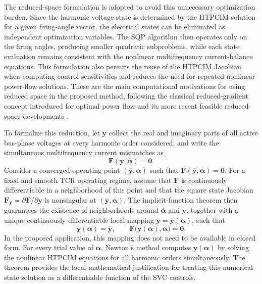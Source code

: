 \documentclass[journal]{IEEEtran}
\begin{document}
The reduced-space formulation is adopted to avoid this unnecessary
optimization burden. Since the harmonic voltage state is determined by the
HTPCIM solution for a given firing-angle vector, the electrical states can be
eliminated as independent optimization variables. The SQP algorithm then
operates only on the firing angles, producing smaller quadratic subproblems,
while each state evaluation remains consistent with the nonlinear
multifrequency current-balance equations. This formulation also permits the
reuse of the HTPCIM Jacobian when computing control sensitivities and reduces
the need for repeated nonlinear power-flow solutions. These are the main
computational motivations for using reduced space in the proposed method,
following the classical reduced-gradient concept introduced for optimal
power flow and its more recent feasible reduced-space developments
\cite{DommelTinney1968,Pacaud2022ReducedSpace}.

To formalize this reduction, let
$\bm{y}$ collect the real and imaginary parts of all active bus-phase
voltages at every harmonic order considered, and write the simultaneous
multifrequency current mismatches as
\begin{equation}
    \bm{F}(\bm{y},\bm{\alpha})=\bm{0}.
    \label{eq:htpcim_state_equations}
\end{equation}
Consider a converged operating point
$(\overline{\bm{y}},\overline{\bm{\alpha}})$ such that
$\bm{F}(\overline{\bm{y}},\overline{\bm{\alpha}})=\bm{0}$. For a fixed and
smooth TCR operating regime, assume that $\bm{F}$ is continuously
differentiable in a neighborhood of this point and that the square state
Jacobian
$\bm{F}_{\bm{y}}=\partial\bm{F}/\partial\bm{y}$ is nonsingular at
$(\overline{\bm{y}},\overline{\bm{\alpha}})$. The implicit-function theorem
then guarantees the existence of neighborhoods around
$\overline{\bm{\alpha}}$ and $\overline{\bm{y}}$, together with a unique
continuously differentiable local mapping
$\bm{y}=\bm{y}(\bm{\alpha})$, such that
\begin{equation}
    \bm{y}(\overline{\bm{\alpha}})=\overline{\bm{y}},
    \qquad
    \bm{F}\bigl(\bm{y}(\bm{\alpha}),\bm{\alpha}\bigr)=\bm{0}.
    \label{eq:implicit_state_map}
\end{equation}
In the proposed application, this mapping does not need to be available in
closed form. For every trial value of $\bm{\alpha}$, Newton's method computes
$\bm{y}(\bm{\alpha})$ by solving the nonlinear HTPCIM equations for all
harmonic orders simultaneously. The theorem provides the local mathematical
justification for treating this numerical state solution as a differentiable
function of the SVC controls.
\end{document}
